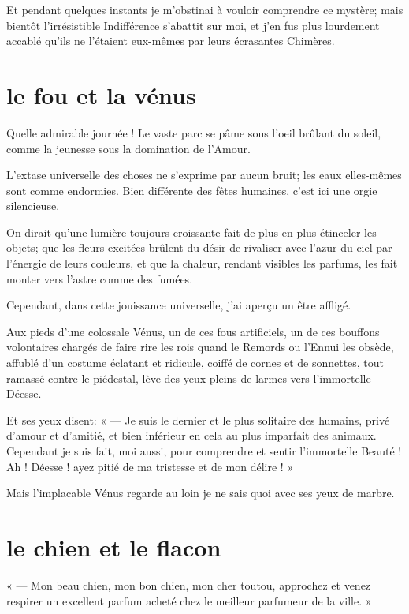 Et pendant quelques instants je m’obstinai à vouloir
comprendre ce mystère; mais bientôt l’irrésistible
Indifférence s’abattit sur moi, et
j’en fus plus lourdement accablé
qu’ils ne l’étaient eux{}-mêmes par
leurs écrasantes Chimères.

\quebra\section[Le fou et la vénus]{le fou et la vénus }

Quelle admirable journée ! Le vaste parc se pâme sous
l’oeil brûlant du soleil, comme la jeunesse sous la
domination de l’Amour.

L’extase universelle des choses ne
s’exprime par aucun bruit; les eaux elles{}-mêmes sont
comme endormies. Bien différente des fêtes humaines,
c’est ici une orgie silencieuse.

On dirait qu’une lumière toujours croissante fait de
plus en plus étinceler les objets; que les fleurs excitées brûlent du
désir de rivaliser avec l’azur du ciel par
l’énergie de leurs couleurs, et que la chaleur,
rendant visibles les parfums, les fait monter vers
l’astre comme des fumées.

Cependant, dans cette jouissance universelle, j’ai
aperçu un être affligé.

Aux pieds d’une colossale Vénus, un de ces fous
artificiels, un de ces bouffons volontaires chargés de faire rire les
rois quand le Remords ou l’Ennui les obsède, affublé
d’un costume éclatant et ridicule, coiffé de cornes et
de sonnettes, tout ramassé contre le piédestal, lève des yeux pleins de
larmes vers l’immortelle Déesse.

Et ses yeux disent: « --- Je suis le dernier et le plus solitaire des
humains, privé d’amour et d’amitié,
et bien inférieur en cela au plus imparfait des animaux. Cependant je
suis fait, moi aussi, pour comprendre et sentir
l’immortelle Beauté ! Ah ! Déesse ! ayez pitié de ma
tristesse et de mon délire ! »

Mais l’implacable Vénus regarde au loin je ne sais quoi
avec ses yeux de marbre.

\quebra\section[Le chien et le flacon]{le chien et le flacon }

« --- Mon beau chien, mon bon chien, mon cher toutou, approchez et venez
respirer un excellent parfum acheté chez le meilleur parfumeur de la
ville. »

